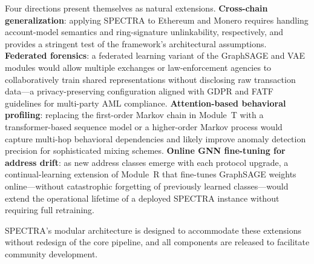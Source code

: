 Four directions present themselves as natural extensions.
\textbf{Cross-chain generalization}: applying SPECTRA to Ethereum and
Monero requires handling account-model semantics and ring-signature
unlinkability, respectively, and provides a stringent test of the
framework's architectural assumptions.
\textbf{Federated forensics}: a federated learning variant of the
GraphSAGE and VAE modules would allow multiple exchanges or law-enforcement
agencies to collaboratively train shared representations without disclosing
raw transaction data---a privacy-preserving configuration aligned with
GDPR and FATF guidelines for multi-party AML compliance.
\textbf{Attention-based behavioral profiling}: replacing the first-order
Markov chain in Module~T with a transformer-based sequence model or a
higher-order Markov process would capture multi-hop behavioral dependencies
and likely improve anomaly detection precision for sophisticated mixing
schemes.
\textbf{Online GNN fine-tuning for address drift}: as new address classes
emerge with each protocol upgrade, a continual-learning extension of
Module~R that fine-tunes GraphSAGE weights online---without catastrophic
forgetting of previously learned classes---would extend the operational
lifetime of a deployed SPECTRA instance without requiring full retraining.

\textsc{SPECTRA}'s modular architecture is designed to accommodate these
extensions without redesign of the core pipeline, and all components are
released to facilitate community development.
